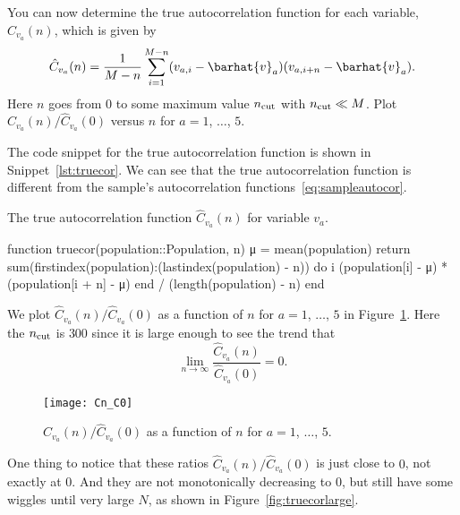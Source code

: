  You can now determine the true autocorrelation function for each variable,
\(\hat{C}_{v_a}(n)\), which is given by
%
\begin{equation}
    \hat{C}_{v_a}(n) = \frac{ 1 }{ M - n }
    \sum_{i=1}^{M-n} (v_{a,i} - \barhat{v}_a) (v_{a,i + n} - \barhat{v}_a).
\end{equation}
%
Here \(n\) goes from \(0\) to some maximum value \(n_\textnormal{cut}\) with
\(n_\textnormal{cut} \ll M\).
Plot \(\hat{C}_{v_a}(n) / \hat{C}_{v_a}(0)\) versus \(n\) for \(a = 1\), \(\ldots\), \(5\).

\Answer{}
The code snippet for the true autocorrelation function is shown in Snippet~\ref{lst:truecor}.
We can see that the true autocorrelation function is different from the sample's
autocorrelation functions~\eqref{eq:sampleautocor}.

\begin{algorithm}
    \caption{The true autocorrelation function \(\hat{C}_{v_a}(n)\) for variable \(v_a\).}
    \label{lst:truecor}
    \begin{juliacode}
        function truecor(population::Population, n)
            μ = mean(population)
            return sum(firstindex(population):(lastindex(population) - n)) do i
                (population[i] - μ) * (population[i + n] - μ)
            end / (length(population) - n)
        end
    \end{juliacode}
\end{algorithm}

We plot \(\hat{C}_{v_a}(n) / \hat{C}_{v_a}(0)\) as a function of \(n\) for \(a = 1\), \(\ldots\),
\(5\) in Figure~\ref{fig:truecor}.
Here the \(n_\textnormal{cut}\) is \(300\) since it is large enough to see the trend
that
%
\begin{equation}
    \lim_{n \rightarrow \infty} \frac{ \hat{C}_{v_a}(n) }{ \hat{C}_{v_a}(0) } = 0.
\end{equation}

\begin{figure}[h]
    \centering
    \texttt{[image: Cn\_C0]}
    \caption{\(\hat{C}_{v_a}(n) / \hat{C}_{v_a}(0)\) as a function of \(n\) for
        \(a = 1\), \(\ldots\), \(5\).}
    \label{fig:truecor}
\end{figure}

One thing to notice that these ratios \(\hat{C}_{v_a}(n) / \hat{C}_{v_a}(0)\)
is just close to \(0\), not exactly at \(0\). And they are not monotonically decreasing
to \(0\), but still have some wiggles until very large \(N\), as shown in
Figure~\ref{fig:truecorlarge}.

